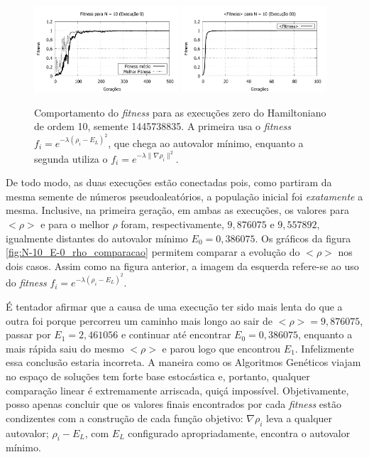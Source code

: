	\begin{figure}[htbp]
		\centering
			\includegraphics[width=0.48\textwidth]{figs/resultados/fitnessEL/N-10_E-0_fitness.pdf}
			\includegraphics[width=0.48\textwidth]{figs/resultados/fitnessGrad/N10_00_fitness.pdf}
		\caption{Comportamento do \textit{fitness} para as execuções zero do Hamiltoniano de ordem 10, semente 1445738835. A primeira usa o \textit{fitness} $f_i = e^{-\lambda(\rho_i - E_L)^2}$, que chega ao autovalor mínimo, enquanto a segunda utiliza o $f_i = e^{-\lambda \| \nabla \rho_i \|^2}$.}
		\label{fig:N-10_E-0_fitness}
	\end{figure}
	
	De todo modo, as duas execuções estão conectadas pois, como partiram da mesma semente de números pseudoaleatórios, a população inicial foi \textit{exatamente} a mesma. Inclusive, na primeira geração, em ambas as execuções, os valores para $<\rho>$ e para o melhor $\rho$ foram, respectivamente, $9,876075$ e $9,557892$, igualmente distantes do autovalor mínimo $E_0 = 0,386075$. Os gráficos da figura \ref{fig:N-10_E-0_rho_comparacao} permitem comparar a evolução do $<\rho>$ nos dois casos. Assim como na figura anterior, a imagem da esquerda refere-se ao uso do \textit{fitness} $f_i = e^{-\lambda(\rho_i - E_L)^2}$.
	
	É tentador afirmar que a causa de uma execução ter sido mais lenta do que a outra foi porque percorreu um caminho mais longo ao sair de $<\rho> = 9,876075$, passar por $E_1 = 2,461056$ e continuar até encontrar $E_0 = 0,386075$, enquanto a mais rápida saiu do mesmo $<\rho>$ e parou logo que encontrou $E_1$. Infelizmente essa conclusão estaria incorreta. A maneira como os Algoritmos Genéticos viajam no espaço de soluções tem forte base estocástica e, portanto, qualquer comparação linear é extremamente arriscada, quiçá impossível. Objetivamente, posso apenas concluir que os valores finais encontrados por cada \textit{fitness} estão condizentes com a construção de cada função objetivo: $\nabla \rho_i$ leva a qualquer autovalor; $\rho_i - E_L$, com $E_L$ configurado apropriadamente, encontra o autovalor mínimo.
	
